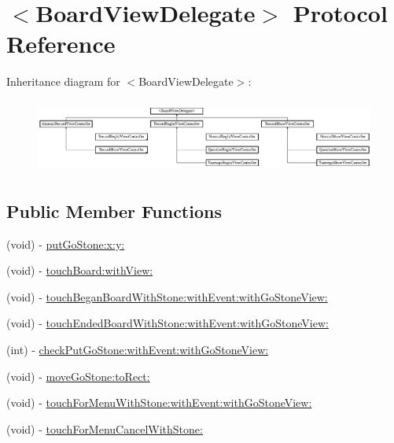\hypertarget{protocol_board_view_delegate-p}{
\section{$<$BoardViewDelegate$>$ Protocol Reference}
\label{protocol_board_view_delegate-p}
}
Inheritance diagram for $<$BoardViewDelegate$>$:\begin{figure}[H]
\begin{center}
\leavevmode
\includegraphics[height=2.430556cm]{protocol_board_view_delegate-p}
\end{center}
\end{figure}
\subsection*{Public Member Functions}
\begin{DoxyCompactItemize}
\item 
(void) -\/ \hyperlink{protocol_board_view_delegate-p_ad0d33bf44affc3968942b067298b27e1}{putGoStone:x:y:}
\item 
(void) -\/ \hyperlink{protocol_board_view_delegate-p_ae27882adf09c3c45fca26507c2ebbf61}{touchBoard:withView:}
\item 
(void) -\/ \hyperlink{protocol_board_view_delegate-p_a75390bd4c876b71554b923a5535bf92d}{touchBeganBoardWithStone:withEvent:withGoStoneView:}
\item 
(void) -\/ \hyperlink{protocol_board_view_delegate-p_a0f4b2f994e74394a65b54bd69c21c5be}{touchEndedBoardWithStone:withEvent:withGoStoneView:}
\item 
(int) -\/ \hyperlink{protocol_board_view_delegate-p_aa6d7749ac3e452a0efadd556d8cbea08}{checkPutGoStone:withEvent:withGoStoneView:}
\item 
(void) -\/ \hyperlink{protocol_board_view_delegate-p_ab54d6613216df24e372a5f76dd8ee381}{moveGoStone:toRect:}
\item 
(void) -\/ \hyperlink{protocol_board_view_delegate-p_a6f9e2096e1d19ff722211568411bccd0}{touchForMenuWithStone:withEvent:withGoStoneView:}
\item 
(void) -\/ \hyperlink{protocol_board_view_delegate-p_aadc288eb1b4da3347ffce2a655c2eb21}{touchForMenuCancelWithStone:}
\end{DoxyCompactItemize}



